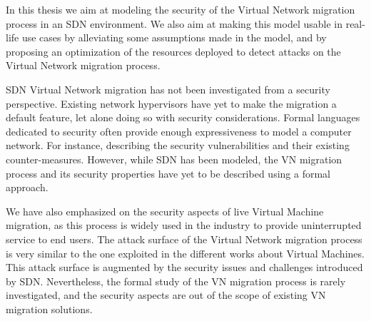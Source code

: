 In this thesis we aim at modeling the security of the Virtual Network migration process in an SDN environment.
We also aim at making this model usable in real-life use cases by alleviating some assumptions made in the model, and by proposing an optimization of the resources deployed to detect attacks on the Virtual Network migration process.

SDN Virtual Network migration has not been investigated from a security perspective.
Existing network hypervisors have yet to make the migration a default feature, let alone doing so with security considerations.
Formal languages dedicated to security often provide enough expressiveness to model a computer network. 
For instance, describing the security vulnerabilities and their existing counter-measures.
However, while SDN has been modeled, the VN migration process and its security properties have yet to be described using a formal approach.

We have also emphasized on the security aspects of live Virtual Machine migration, as this process is widely used in the industry to provide uninterrupted service to end users. 
The attack surface of the Virtual Network migration process is very similar to the one exploited in the different works about Virtual Machines. This attack surface is augmented by the security issues and challenges introduced by SDN. Nevertheless, the formal study of the VN migration process is rarely investigated, and the security aspects are out of the scope of existing VN migration solutions.


